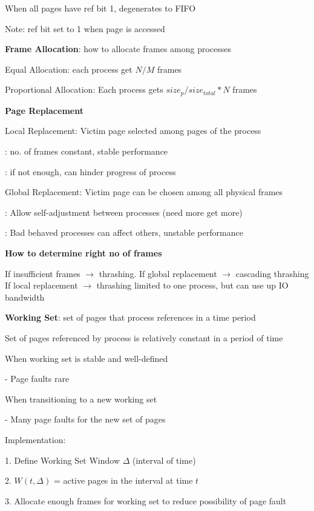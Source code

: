 \documentclass[10pt, a4paper]{article}
\newcommand{\blue}[1]{{\color{MidnightBlue}#1}}
\newcommand{\red}[1]{{\color{red}#1}}
\newcommand{\green}[1]{{\color{ForestGreen}#1}}
\newcommand{\tab}[0]{\hspace*{2mm}}
\begin{document}
\begin{multicols*}{3}
		When \red{all} pages have ref bit 1, degenerates to \red{FIFO}

		\red{Note}: ref bit set to 1 when page is accessed

		\textbf{Frame Allocation}: how to allocate frames among processes

		\red{Equal Allocation}: each process get $N / M$ frames

		\green{Proportional Allocation}: Each process gets $size_p / size_{total} * N$ frames

		\textbf{Page Replacement}

		\red{Local Replacement}: Victim page selected \blue{among pages of the process}

		\tab{}\green{Pros}: no. of frames constant, stable performance

		\tab{}\red{Cons}: if not enough, can hinder progress of process
	
		\green{Global Replacement}: Victim page can be chosen \blue{among all physical frames}

		\tab{}\green{Pros}: Allow self-adjustment between processes (need more get more)

		\tab{}\red{Cons}: Bad behaved processes can affect others, unstable performance
		
		\textbf{How to determine right no of frames}

		If insufficient frames $\rightarrow$ thrashing. If global replacement $\rightarrow$ cascading thrashing
		If local replacement $\rightarrow$ thrashing limited to one process, but can use up IO bandwidth

		\textbf{Working Set}: set of pages that process references in a time period

		Set of pages referenced by process is \blue{relatively constant} in a period of time

		When working set is stable and well-defined

		\tab{} - Page faults rare

		When transitioning to a new working set

		\tab{} - Many page faults for the new set of pages

		Implementation:

		1. Define Working Set Window $\Delta$ (interval of time)

		2. $W(t, \Delta)$ = active pages in the interval at time $t$

		3. Allocate enough frames for working set to reduce possibility of page fault


\end{multicols*}
\end{document}
